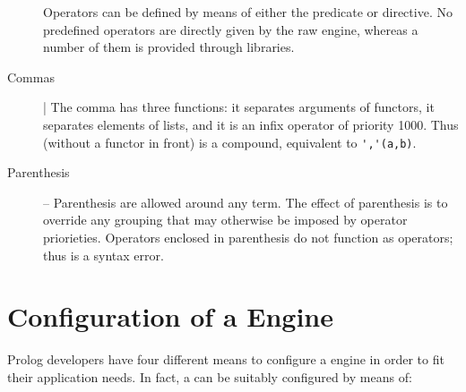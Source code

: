 \begin{description}
Operators can be defined by means of either the  predicate or directive.
%
No predefined operators are directly given by the raw \tuprolog{} engine, whereas a number of them is provided through libraries.
%
\item[Commas] |
The comma has three functions: it separates arguments of functors, it separates elements of lists, and it is an infix operator of priority 1000.
%
Thus  (without a functor in front) is a compound, equivalent to \verb|','(a,b)|.
%
\item[Parenthesis] -- Parenthesis are allowed around any term.
%
The effect of parenthesis is to override any grouping that may
otherwise be imposed by operator priorieties.
%
Operators enclosed in parenthesis do not function as operators;
thus  is a syntax error.
\end{description}

\section{Configuration of a \tuprolog{} Engine}
\noindent Prolog developers have four different means to configure a \tuprolog{} engine in order to fit their application needs.
%
In fact, a \tuprolog{} can be suitably configured by means of:

